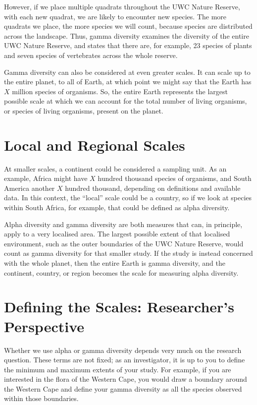 \documentclass[
  12pt,
]{book}
\begin{document}
However, if we place multiple quadrats throughout the UWC Nature
Reserve, with each new quadrat, we are likely to encounter new species.
The more quadrats we place, the more species we will count, because
species are distributed across the landscape. Thus, gamma diversity
examines the diversity of the entire UWC Nature Reserve, and states that
there are, for example, 23 species of plants and seven species of
vertebrates across the whole reserve.

Gamma diversity can also be considered at even greater scales. It can
scale up to the entire planet, to all of Earth, at which point we might
say that the Earth has \(X\) million species of organisms. So, the
entire Earth represents the largest possible scale at which we can
account for the total number of living organisms, or species of living
organisms, present on the planet.

\section{Local and Regional Scales}\label{local-and-regional-scales}

At smaller scales, a continent could be considered a sampling unit. As
an example, Africa might have \(X\) hundred thousand species of
organisms, and South America another \(X\) hundred thousand, depending
on definitions and available data. In this context, the ``local'' scale
could be a country, so if we look at species within South Africa, for
example, that could be defined as alpha diversity.

Alpha diversity and gamma diversity are both measures that can, in
principle, apply to a very localised area. The largest possible extent
of that localised environment, such as the outer boundaries of the UWC
Nature Reserve, would count as gamma diversity for that smaller study.
If the study is instead concerned with the whole planet, then the entire
Earth is gamma diversity, and the continent, country, or region becomes
the scale for measuring alpha diversity.

\section{Defining the Scales: Researcher's
Perspective}\label{defining-the-scales-researchers-perspective}

Whether we use alpha or gamma diversity depends very much on the
research question. These terms are not fixed; as an investigator, it is
up to you to define the minimum and maximum extents of your study. For
example, if you are interested in the flora of the Western Cape, you
would draw a boundary around the Western Cape and define your gamma
diversity as all the species observed within those boundaries.
\end{document}
